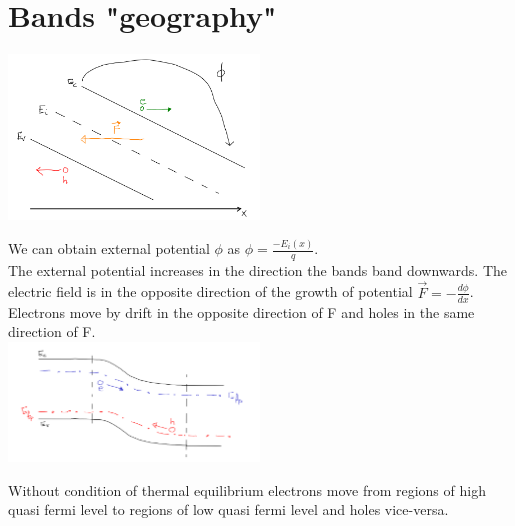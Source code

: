 \section{Bands "geography"}

\centering
\includegraphics[width=0.5\textwidth]{bandsgeo.png}\\
\raggedright

We can obtain external potential $\phi$ as $\phi=\frac{-E_i(x)}{q}$.\\
The external potential increases in the direction the bands band downwards. The electric field is in the opposite direction of the growth of potential $\vec{F}=-\frac{d\phi}{dx}$.\\
Electrons move by drift in the opposite direction of F and holes in the same direction of F.\\

\centering
\includegraphics[width=0.5\textwidth]{bandsgeo2.png}\\
\raggedright

Without condition of thermal equilibrium electrons move from regions of high quasi fermi level to regions of low quasi fermi level and holes vice-versa.
